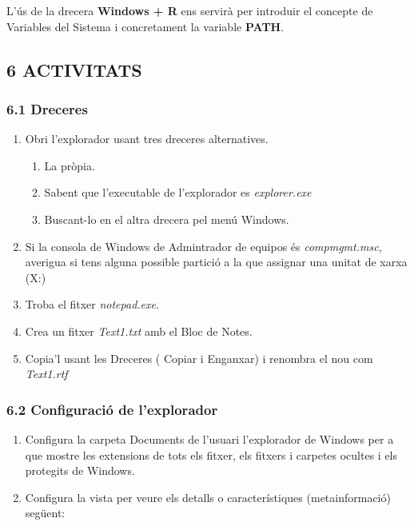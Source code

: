 \documentclass[
  a4paper,
]{article}
\providecommand{\tightlist}{%
  \setlength{\itemsep}{0pt}\setlength{\parskip}{0pt}}
\begin{document}
L'ús de la drecera \textbf{Windows + R} ens servirà per introduir el
concepte de Variables del Sistema i concretament la variable
\textbf{PATH}.

\subsection{6 ACTIVITATS}\label{activitats}

\subsubsection{6.1 Dreceres}\label{dreceres-1}

\begin{enumerate}
\def\labelenumi{\arabic{enumi}.}
\item
  Obri l'explorador usant tres dreceres alternatives.

  \begin{enumerate}
  \def\labelenumii{\alph{enumii})}
  \tightlist
  \item
    La pròpia.
  \item
    Sabent que l'executable de l'explorador es \emph{explorer.exe}
  \item
    Buscant-lo en el altra drecera pel menú Windows.
  \end{enumerate}
\item
  Si la consola de Windows de Admintrador de equipos és
  \emph{compmgmt.msc}, averigua si tens alguna possible partició a la
  que assignar una unitat de xarxa (X:)
\item
  Troba el fitxer \emph{notepad.exe}.
\item
  Crea un fitxer \emph{Text1.txt} amb el Bloc de Notes.
\item
  Copia'l usant les Dreceres ( Copiar i Enganxar) i renombra el nou com
  \emph{Text1.rtf}
\end{enumerate}

\subsubsection{6.2 Configuració de
l'explorador}\label{configuraciuxf3-de-lexplorador}

\begin{enumerate}
\def\labelenumi{\arabic{enumi}.}
\item
  Configura la carpeta Documents de l'usuari l'explorador de Windows per
  a que mostre les extensions de tots els fitxer, els fitxers i carpetes
  ocultes i els protegits de Windows.
\item
  Configura la vista per veure els detalls o característiques
  (metainformació) següent:
\end{enumerate}
\end{document}
